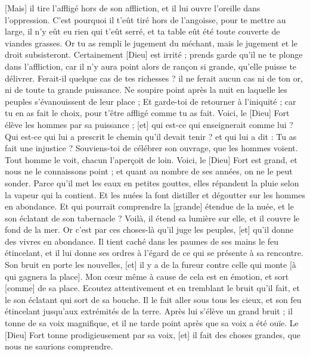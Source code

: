 \begin{multicols}{2}
[Mais] il tire l'affligé hors de son affliction, et il lui ouvre l'oreille dans l'oppression.
C'est pourquoi il t'eût tiré hors de l'angoisse, pour te mettre au large, il n'y eût eu rien qui t'eût serré, et ta table eût été toute couverte de viandes grasses.
Or tu as rempli le jugement du méchant, mais le jugement et le droit subsisteront.
Certainement [Dieu] est irrité ; prends garde qu'il ne te plonge dans l'affliction, car il n'y aura point alors de rançon si grande, qu'elle puisse te délivrer.
Ferait-il quelque cas de tes richesses ? il ne ferait aucun cas ni de ton or, ni de toute ta grande puissance.
Ne soupire point après la nuit en laquelle les peuples s'évanouissent de leur place ;
Et garde-toi de retourner à l'iniquité ; car tu en as fait le choix, pour t'être affligé comme tu as fait.
Voici, le [Dieu] Fort élève les hommes par sa puissance ; [et] qui est-ce qui enseignerait comme lui ?
Qui est-ce qui lui a prescrit le chemin qu'il devait tenir ? et qui lui a dit : Tu as fait une injustice ?
Souviens-toi de célébrer son ouvrage, que les hommes voient.
Tout homme le voit, chacun l'aperçoit de loin.
Voici, le [Dieu] Fort est grand, et nous ne le connaissons point ; et quant au nombre de ses années, on ne le peut sonder.
Parce qu'il met les eaux en petites gouttes, elles répandent la pluie selon la vapeur qui la contient.
Et les nuées la font distiller et dégoutter sur les hommes en abondance.
Et qui pourrait comprendre la [grande] étendue de la nuée, et le son éclatant de son tabernacle ?
Voilà, il étend sa lumière sur elle, et il couvre le fond de la mer.
Or c'est par ces choses-là qu'il juge les peuples, [et] qu'il donne des vivres en abondance.
Il tient caché dans les paumes de ses mains le feu étincelant, et il lui donne ses ordres à l'égard de ce qui se présente à sa rencontre.
Son bruit en porte les nouvelles, [et] il y a de la fureur contre celle qui monte [à qui gagnera la place].
\VerseOne{}Mon cœur même à cause de cela est en émotion, et sort [comme] de sa place.
Ecoutez attentivement et en tremblant le bruit qu'il fait, et le son éclatant qui sort de sa bouche.
Il le fait aller sous tous les cieux, et son feu étincelant jusqu'aux extrémités de la terre.
Après lui s'élève un grand bruit ; il tonne de sa voix magnifique, et il ne tarde point après que sa voix a été ouïe.
Le [Dieu] Fort tonne prodigieusement par sa voix, [et] il fait des choses grandes, que nous ne saurions comprendre.

\end{multicols}
